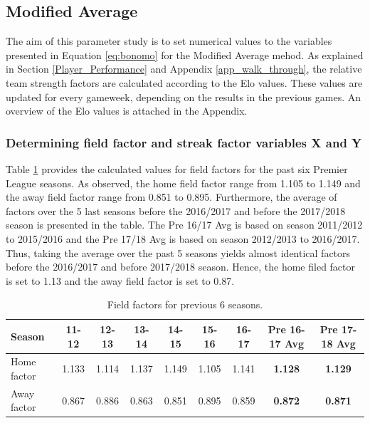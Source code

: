\subsection{Modified Average}
The aim of this parameter study is to set numerical values to the variables presented in Equation \ref{eq:bonomo} for the Modified Average mehod. As explained in Section \ref{Player_Performance} and Appendix \ref{app_walk_through}, the relative team strength factors are calculated according to the Elo values. These values are updated for every gameweek, depending on the results in the previous games. An overview of the Elo values is attached in the Appendix. 

\newpar

\subsubsection{Determining field factor and streak factor variables X and Y}

Table \ref{Field advantage} provides the calculated values for field factors for the past six Premier League seasons. As observed, the home field factor range from 1.105 to 1.149 and the away field factor range from 0.851 to 0.895. Furthermore, the average of factors over the 5 last seasons before the 2016/2017 and before the 2017/2018 season is presented in the table. The Pre 16/17 Avg is based on season 2011/2012 to 2015/2016 and the Pre 17/18 Avg is based on season 2012/2013 to 2016/2017. Thus, taking the average over the past 5 seasons yields almost identical factors before the 2016/2017 and before 2017/2018 season. Hence, the home filed factor is set to 1.13 and the away field factor is set to 0.87. 


\begin{table}[H]
\centering
\smaller
\begin{tabular}{|l|c|c|c|c|c|c|c|c|}
\hline
Season & 11-12    & 12-13   & 13-14    & 14-15    & 15-16 & 16-17 & Pre 16-17 Avg & Pre 17-18 Avg \\ 
\hline
Home factor & 1.133 & 1.114 & 1.137 & 1.149 & 1.105 & 1.141 & \textbf{1.128} & \textbf{1.129}\\
\hline
Away factor & 0.867 & 0.886 & 0.863 & 0.851 & 0.895 & 0.859 & \textbf{0.872} & \textbf{0.871}\\
\hline
\end{tabular}
\caption{Field factors for previous 6 seasons.}
\label{Field advantage}
\end{table}

